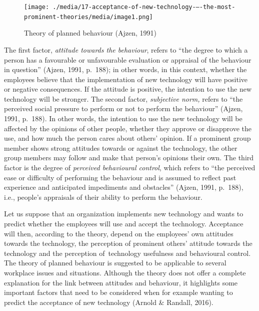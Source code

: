 \documentclass[
  12pt,
]{scrbook}
\begin{document}
\begin{figure}
\hypertarget{fig:figure161}{%
\centering
\texttt{[image: ./media/17-acceptance-of-new-technology-–-the-most-prominent-theories/media/image1.png]}
\caption[Theory of planned behaviour (Ajzen, 1991) ~]{Theory of planned behaviour (Ajzen, 1991)\footnotemark{} ~}\label{fig:figure161}
}
\end{figure}

The first factor, \emph{attitude towards the behaviour}, refers to ``the degree to which a person has a favourable or unfavourable evaluation or appraisal of the behaviour in question'' (Ajzen, 1991, p.~188); in other words, in this context, whether the employees believe that the implementation of new technology will have positive or negative consequences. If the attitude is positive, the intention to use the new technology will be stronger. The second factor, \emph{subjective norm,} refers to ``the perceived social pressure to perform or not to perform the behaviour'' (Ajzen, 1991, p.~188). In other words, the intention to use the new technology will be affected by the opinions of other people, whether they approve or disapprove the use, and how much the person cares about others' opinion. If a prominent group member shows strong attitudes towards or against the technology, the other group members may follow and make that person's opinions their own. The third factor is the degree of \emph{perceived behavioural control}, which refers to ``the perceived ease or difficulty of performing the behaviour and is assumed to reflect past experience and anticipated impediments and obstacles'' (Ajzen, 1991, p.~188), i.e., people's appraisals of their ability to perform the behaviour.~

Let us suppose that an organization implements new technology and wants to predict whether the employees will use and accept the technology. Acceptance will then, according to the theory, depend on the employees' own attitudes towards the technology, the perception of prominent others' attitude towards the technology and the perception of~technology usefulness and behavioural control. The theory of planned behaviour is suggested to be applicable to several workplace issues and situations. Although the theory does not offer a complete explanation for the link between attitudes and behaviour, it highlights some important factors that need to be considered when for example wanting to predict the acceptance of new technology (Arnold \& Randall, 2016).~
\end{document}

